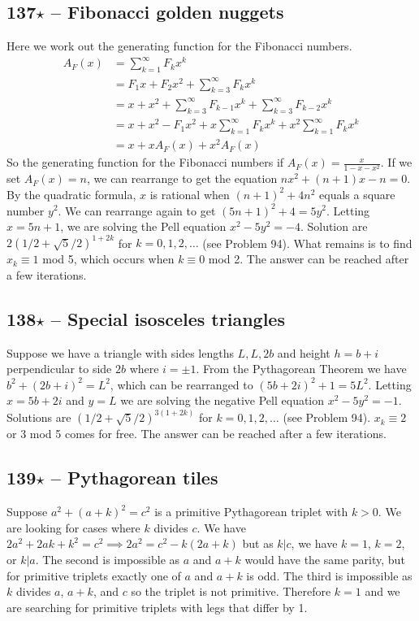 \documentclass{article}
\begin{document}
\subsection*{137$\star$ -- Fibonacci golden nuggets} 
Here we work out the generating function for the Fibonacci numbers.
\begin{align*}
A_F(x) &= \sum\limits_{k=1}^\infty F_k x^k \\
&= F_1x + F_2x^2 + \sum\limits_{k=3}^\infty F_k x^k \\
&= x + x^2 + \sum\limits_{k=3}^\infty F_{k-1} x^k +  \sum\limits_{k=3}^\infty F_{k-2} x^k \\
&= x + x^2  - F_1x^2 + x\sum\limits_{k=1}^\infty F_k x^k +  x^2\sum\limits_{k=1}^\infty F_k x^k \\
&=  x + xA_F(x) + x^2A_F(x)
\end{align*}
So the generating function for the Fibonacci numbers if $A_F(x) = \frac{x}{1-x-x^2}$.
If we set $A_F(x) = n$, we can rearrange to get the equation $nx^2 + (n+1)x - n = 0$. 
By the quadratic formula, $x$ is rational when $(n+1)^2 + 4n^2$ equals a square number $y^2$. 
We can rearrange again to get $(5n+1)^2 + 4 = 5y^2$. 
Letting $x=5n+1$, we are solving the Pell equation $x^2 - 5y^2  = -4$. 
Solution are $2(1/2 + \sqrt{5}/2)^{1 + 2k}$ for $k = 0, 1, 2, \dotsc$ (see Problem 94). 
What remains is to find $x_k \equiv 1$ mod 5, which occurs when $k \equiv 0$ mod 2.
The answer can be reached after a few iterations.

\subsection*{138$\star$ -- Special isosceles triangles} 
Suppose we have a triangle with sides lengths $L, L, 2b$ and height $h = b + i$ perpendicular to side $2b$ where $i = \pm 1$. 
From the Pythagorean Theorem we have $b^2 + (2b+i)^2 = L^2$, which can be rearranged to $(5b+2i)^2+1 = 5L^2$. 
Letting $x = 5b+2i$ and $y= L$ we are solving the negative Pell equation $x^2 - 5y^2 = -1$. 
Solutions are $(1/2 + \sqrt{5}/2)^{3(1 + 2k)}$ for $k = 0, 1, 2, \dotsc$ (see Problem 94). 
$x_k \equiv 2$ or 3 mod 5 comes for free. 
The answer can be reached after a few iterations.

\subsection*{139$\star$ -- Pythagorean tiles} 
Suppose $a^2 + (a+k)^2 = c^2$ is a primitive Pythagorean triplet with $k > 0$. 
We are looking for cases where $k$ divides $c$. 
We have $2a^2 + 2ak + k^2 = c^2 \implies 2a^2 = c^2 - k(2a +k)$ but as $k|c$, we have $k=1$, $k=2$, or $k|a$. 
The second is impossible as $a$ and $a+k$ would have the same parity, but for primitive triplets exactly one of $a$ and $a+k$ is odd. 
The third is impossible as $k$ divides $a$, $a+k$, and $c$ so the triplet is not primitive. 
Therefore $k=1$ and we are searching for primitive triplets with legs that differ by 1. \\
\end{document}
